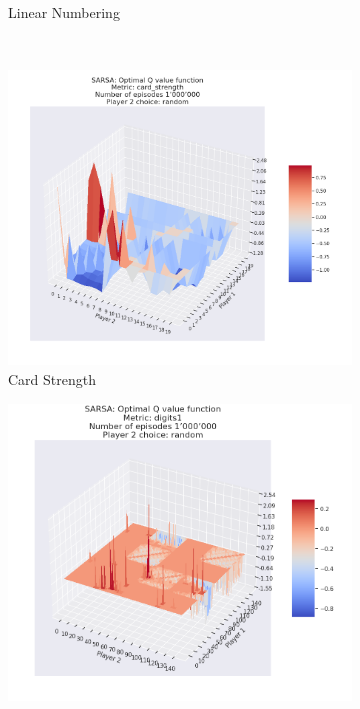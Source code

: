 \begin{figure}[ht!]
\begin{subfigure}{0.5\textwidth}
        \caption[Linear Numbering]{Linear Numbering}
        \label{fig:SARSAlinear numbering}
    \end{subfigure} \\
    \begin{subfigure}{0.5\textwidth}
        \includegraphics[width=1\linewidth]{Figures/SARSA_card_strength_1000000_random}
        \caption[Card Strength]{Card Strength}
        \label{fig:SARSAcard strength}
    \end{subfigure}
    \begin{subfigure}{0.5\textwidth}
        \includegraphics[width=1\linewidth]{Figures/SARSA_digits1_1000000_random} 

\end{subfigure}
\end{figure}
